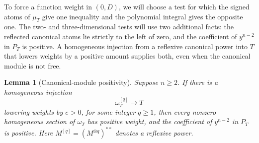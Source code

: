 \documentclass[11pt]{article}
\newtheorem{lemma}[theorem]{Lemma}
\theoremstyle{definition}
\theoremstyle{remark}
\numberwithin{equation}{section}
\begin{document}
To force a function weight in \((0,D)\), we will choose a test for which the signed atoms of \(\mu_T\) give one inequality and the polynomial integral gives the opposite one. The two- and three-dimensional tests will use two additional facts: the reflected canonical atoms lie strictly to the left of zero, and the coefficient of \(y^{n-2}\) in \(P_T\) is positive. A homogeneous injection from a reflexive canonical power into \(T\) that lowers weights by a positive amount supplies both, even when the canonical module is not free.

\begin{lemma}[Canonical-module positivity]\label{lem:canonical-positive}
Suppose \(n\ge2\). If there is a homogeneous injection
\begin{equation}\label{eq:injection}
\omega_T^{[q]}\longrightarrow T
\end{equation}
lowering weights by \(e>0\), for some integer \(q\ge1\), then every nonzero homogeneous section of \(\omega_T\) has positive weight, and the coefficient of \(y^{n-2}\) in \(P_T\) is positive. Here \(M^{[q]}=(M^{\otimes q})^{**}\) denotes a reflexive power.
\end{lemma}
\end{document}

